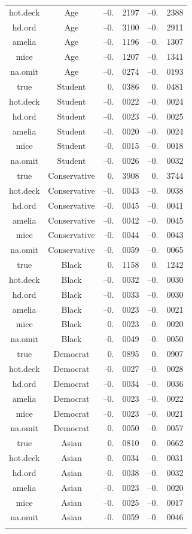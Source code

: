 \documentclass[12pt,econ]{sources/authesis}
\begin{document}
\begin{longtable}{ccr@{}lr@{}l}
 hot.deck & Age & --0.&2197 & --0.&2388 \\
 hd.ord & Age & --0.&3100 & --0.&2911 \\ 
 amelia & Age & --0.&1196 & --0.&1307 \\ 
 mice & Age & --0.&1207 & --0.&1341 \\ 
 na.omit & Age & --0.&0274 & --0.&0193 \\ 
 true & Student & 0.&0386 & 0.&0481 \\ 
 hot.deck & Student & --0.&0022 & --0.&0024 \\
 hd.ord & Student & --0.&0023 & --0.&0025 \\
 amelia & Student & --0.&0020 & --0.&0024 \\
 mice & Student & --0.&0015 & --0.&0018 \\
 na.omit & Student & --0.&0026 & --0.&0032 \\
 true & Conservative & 0.&3908 & 0.&3744 \\
 hot.deck & Conservative & --0.&0043 & --0.&0038 \\
 hd.ord & Conservative & --0.&0045 & --0.&0041 \\
 amelia & Conservative & --0.&0042 & --0.&0045 \\ 
 mice & Conservative & --0.&0044 & --0.&0043 \\
 na.omit & Conservative & --0.&0059 & --0.&0065 \\
 true & Black & 0.&1158 & 0.&1242 \\
 hot.deck & Black & --0.&0032 & --0.&0030 \\
 hd.ord & Black & --0.&0033 & --0.&0030 \\
 amelia & Black & --0.&0023 & --0.&0021 \\
 mice & Black & --0.&0023 & --0.&0020 \\ 
 na.omit & Black & --0.&0049 & --0.&0050 \\ 
 true & Democrat & 0.&0895 & 0.&0907 \\ 
 hot.deck & Democrat & --0.&0027 & --0.&0028 \\
 hd.ord & Democrat & --0.&0034 & --0.&0036 \\
 amelia & Democrat & --0.&0023 & --0.&0022 \\
 mice & Democrat & --0.&0023 & --0.&0021 \\ 
 na.omit & Democrat & --0.&0050 & --0.&0057 \\ 
 true & Asian & 0.&0810 & 0.&0662 \\ 
 hot.deck & Asian & --0.&0034 & --0.&0031 \\ 
 hd.ord & Asian & --0.&0038 & --0.&0032 \\ 
 amelia & Asian & --0.&0023 & --0.&0020 \\
 mice & Asian & --0.&0025 & --0.&0017 \\
 na.omit & Asian & --0.&0059 & --0.&0046 \\ 
 \hline \\[-1.8ex] 
 \end{longtable}
\dsp
\end{document}
